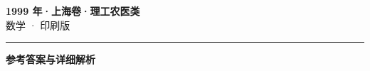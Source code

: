 \documentclass[zihao=5, a4paper]{ctexart}
\begin{document}
\begin{center}
  {\Large\bfseries 1999 年·上海卷·理工农医类}\\[4pt]
  {\large 数学 · 印刷版}
\end{center}
\medskip
{}

\par\bigskip\hrule\bigskip
{}
\begin{center}{\large\bfseries 参考答案与详细解析}\end{center}
\smallskip

\end{document}
